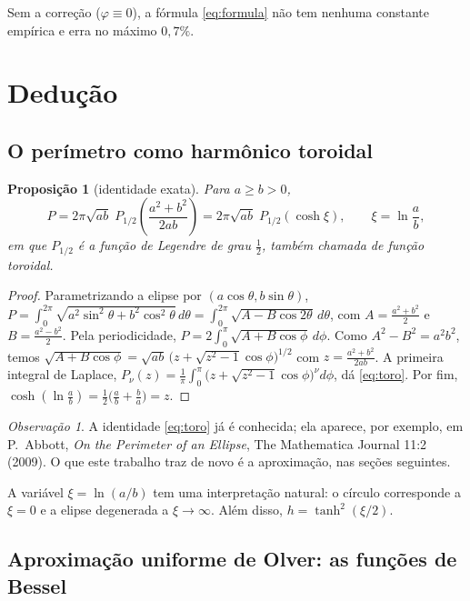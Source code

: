 \documentclass[11pt,a4paper]{article}
\newtheorem{proposicao}[teorema]{Proposição}
\theoremstyle{remark}
\newtheorem{observacao}[teorema]{Observação}
\begin{document}
Sem a correção ($\varphi\equiv0$), a fórmula \eqref{eq:formula} não tem nenhuma
constante empírica e erra no máximo $0{,}7\%$.

\section{Dedução}

\subsection{O perímetro como harmônico toroidal}

\begin{proposicao}[identidade exata]\label{prop:toro}
Para $a\ge b>0$,
\begin{equation}\label{eq:toro}
P=2\pi\sqrt{ab}\;P_{1/2}\!\left(\frac{a^2+b^2}{2ab}\right)
=2\pi\sqrt{ab}\;P_{1/2}(\cosh\xi),\qquad \xi=\ln\frac ab,
\end{equation}
em que $P_{1/2}$ é a função de Legendre de grau $\tfrac12$, também chamada de função toroidal.
\end{proposicao}
\begin{proof}
Parametrizando a elipse por $(a\cos\theta,b\sin\theta)$,
$P=\int_0^{2\pi}\sqrt{a^2\sin^2\theta+b^2\cos^2\theta}\,d\theta
=\int_0^{2\pi}\sqrt{A-B\cos2\theta}\,d\theta$, com $A=\frac{a^2+b^2}{2}$ e $B=\frac{a^2-b^2}{2}$.
Pela periodicidade, $P=2\int_0^{\pi}\sqrt{A+B\cos\phi}\,d\phi$. Como $A^2-B^2=a^2b^2$, temos
$\sqrt{A+B\cos\phi}=\sqrt{ab}\,\big(z+\sqrt{z^2-1}\cos\phi\big)^{1/2}$ com
$z=\frac{a^2+b^2}{2ab}$. A primeira integral de Laplace,
$P_\nu(z)=\frac1\pi\int_0^\pi\big(z+\sqrt{z^2-1}\cos\phi\big)^\nu d\phi$, dá
\eqref{eq:toro}. Por fim, $\cosh(\ln\frac ab)=\frac12\big(\frac ab+\frac ba\big)=z$.
\end{proof}

\begin{observacao}
A identidade \eqref{eq:toro} já é conhecida; ela aparece, por exemplo, em P.~Abbott,
\emph{On the Perimeter of an Ellipse}, The Mathematica Journal 11:2 (2009).
O que este trabalho traz de novo é a aproximação, nas seções seguintes.
\end{observacao}

A variável $\xi=\ln(a/b)$ tem uma interpretação natural: o círculo corresponde a
$\xi=0$ e a elipse degenerada a $\xi\to\infty$. Além disso, $h=\tanh^2(\xi/2)$.

\subsection{Aproximação uniforme de Olver: as funções de Bessel}
\end{document}

